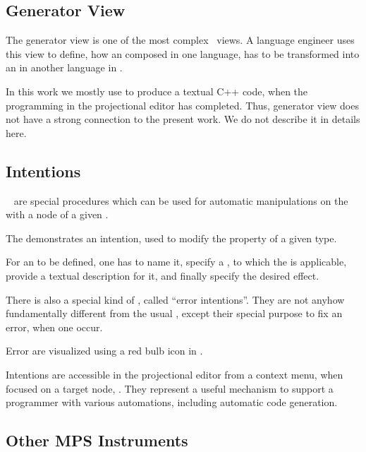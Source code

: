 \subsection{Generator View}
\label{generators}
The generator view is one of the most complex \jbmps\ views. A language engineer uses this view to define, how an  composed
in one language, has to be transformed into an  in another language in \jbmps.

In this work we mostly use  to produce a textual C++ code, when the programming in the projectional editor has completed.
Thus, generator view does not have a strong connection to the present work. We do not describe it in details here.

\subsection{Intentions}
\label{intentions}

\jbmps\  are special procedures which can be used for automatic manipulations on the  with a node of a given .


The  demonstrates an intention, used to modify the  property of a given type. 

For an  to be defined, one has to name it, specify a , to which the  is applicable,
provide a textual description for it, and finally specify the desired effect. 

There is also a special kind of , called ``error intentions''. They are not anyhow fundamentally different 
from the usual , except their special purpose to fix an error, when one occur. 

Error  are visualized using a red bulb icon in \jbmps.

Intentions are accessible in the projectional editor from a context menu, when focused on a target node, . They represent 
a useful mechanism to support a programmer with various automations, including automatic code generation.


\subsection{Other MPS Instruments}

